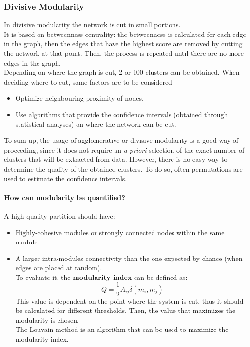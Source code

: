 \subsubsection{Divisive Modularity}
In divisive modularity the network is cut in small portions.\\
It is based on betweenness centrality: the betweenness is calculated for each edge in the graph, then the edges
that have the highest score are removed by cutting the network at that point. Then, the process is repeated until there are
no more edges in the graph.\\
Depending on where the graph is cut, 2 or 100 clusters can be obtained. When deciding where to cut, some
factors are to be considered:
\begin{itemize}
    \item Optimize neighbouring proximity of nodes.
    \item Use algorithms that provide the confidence intervals (obtained through statistical analyses) on where the
          network can be cut.
\end{itemize}
To sum up, the usage of agglomerative or divisive modularity is a good way of proceeding, since it does not require
an \textit{a priori} selection of the exact number of clusters that will be extracted from data. However, there is no
easy way to determine the quality of the obtained clusters. To do so, often permutations are used to estimate the
confidence intervals.
\paragraph{How can modularity be quantified?} A high-quality partition should have:
\begin{itemize}
    \item Highly-cohesive modules or strongly connected nodes within the same module.
    \item A larger intra-modules connectivity than the one expected by chance (when edges are placed at random).\\
          To evaluate it, the \textbf{modularity index} can be defined as:
          \begin{equation*}
              Q=\frac{1}{2}A_{ij}\delta(m_i,m_j)
          \end{equation*}
          This value is dependent on the point where the system is cut, thus it should be calculated for
          different thresholds. Then, the value that maximizes the modularity is chosen.\\
          The Louvain method is an algorithm that can be used to maximize the modularity index.
\end{itemize}

